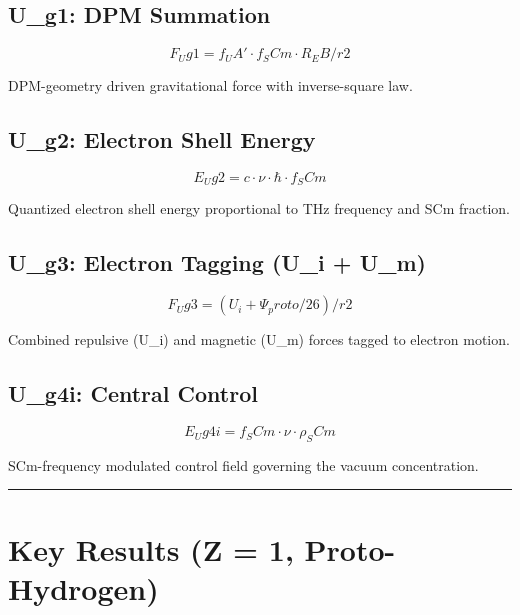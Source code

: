 \documentclass[12pt,a4paper]{article}
\begin{document}
\subsection{U\_g1: DPM Summation}

\begin{equation}
F_Ug1 = f_UA' \cdot f_SCm \cdot R_EB / r2
\end{equation}

DPM-geometry driven gravitational force with inverse-square law.

\subsection{U\_g2: Electron Shell Energy}

\begin{equation}
E_Ug2 = c \cdot \nu \cdot \hbar \cdot f_SCm
\end{equation}

Quantized electron shell energy proportional to THz frequency and SCm fraction.

\subsection{U\_g3: Electron Tagging (U\_i + U\_m)}

\begin{equation}
F_Ug3 = (U_i + \Psi_proto/26) / r2
\end{equation}

Combined repulsive (U\_i) and magnetic (U\_m) forces tagged to electron motion.

\subsection{U\_g4i: Central Control}

\begin{equation}
E_Ug4i = f_SCm \cdot \nu \cdot \rho_SCm
\end{equation}

SCm-frequency modulated control field governing the vacuum concentration.

\medskip\hrule\medskip

\section{Key Results (Z = 1, Proto-Hydrogen)}
\end{document}

